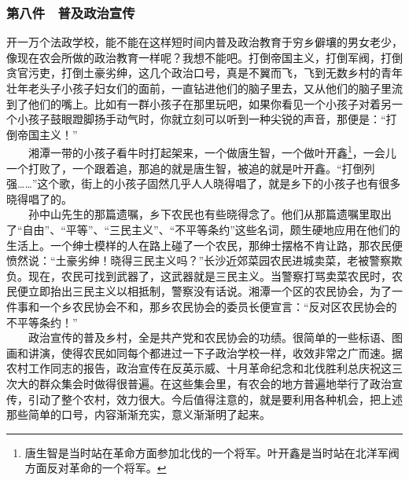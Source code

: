 \documentclass[cn,11pt,chinese]{elegantbook}
\def\myformat#1{\hfil\hfil #1}
\begin{document}
\subsubsection*{\myformat{第八件　普及政治宣传}}
开一万个法政学校，能不能在这样短时间内普及政治教育于穷乡僻壤的男女老少，像现在农会所做的政治教育一样呢？我想不能吧。打倒帝国主义，打倒军阀，打倒贪官污吏，打倒土豪劣绅，这几个政治口号，真是不翼而飞，飞到无数乡村的青年壮年老头子小孩子妇女们的面前，一直钻进他们的脑子里去，又从他们的脑子里流到了他们的嘴上。比如有一群小孩子在那里玩吧，如果你看见一个小孩子对着另一个小孩子鼓眼蹬脚扬手动气时，你就立刻可以听到一种尖锐的声音，那便是：“打倒帝国主义！”\\
　　湘潭一带的小孩子看牛时打起架来，一个做唐生智，一个做叶开鑫\footnote[19]{ 唐生智是当时站在革命方面参加北伐的一个将军。叶开鑫是当时站在北洋军阀方面反对革命的一个将军。}，一会儿一个打败了，一个跟着追，那追的就是唐生智，被追的就是叶开鑫。“打倒列强……”这个歌，街上的小孩子固然几乎人人晓得唱了，就是乡下的小孩子也有很多晓得唱了的。\\
　　孙中山先生的那篇遗嘱，乡下农民也有些晓得念了。他们从那篇遗嘱里取出了“自由”、“平等”、“三民主义”、“不平等条约”这些名词，颇生硬地应用在他们的生活上。一个绅士模样的人在路上碰了一个农民，那绅士摆格不肯让路，那农民便愤然说：“土豪劣绅！晓得三民主义吗？”长沙近郊菜园农民进城卖菜，老被警察欺负。现在，农民可找到武器了，这武器就是三民主义。当警察打骂卖菜农民时，农民便立即抬出三民主义以相抵制，警察没有话说。湘潭一个区的农民协会，为了一件事和一个乡农民协会不和，那乡农民协会的委员长便宣言：“反对区农民协会的不平等条约！”\\
　　政治宣传的普及乡村，全是共产党和农民协会的功绩。很简单的一些标语、图画和讲演，使得农民如同每个都进过一下子政治学校一样，收效非常之广而速。据农村工作同志的报告，政治宣传在反英示威、十月革命纪念和北伐胜利总庆祝这三次大的群众集会时做得很普遍。在这些集会里，有农会的地方普遍地举行了政治宣传，引动了整个农村，效力很大。今后值得注意的，就是要利用各种机会，把上述那些简单的口号，内容渐渐充实，意义渐渐明了起来。\\
\end{document}
